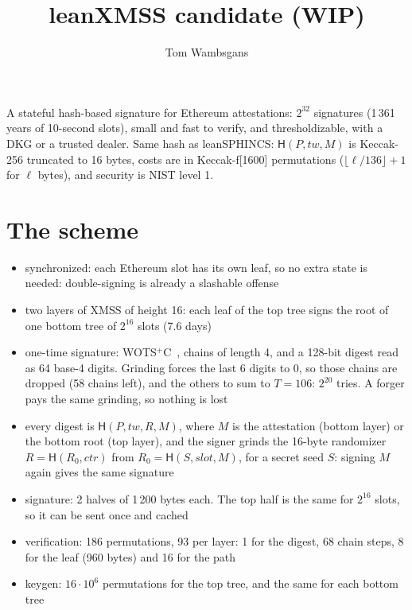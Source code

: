 \documentclass[11pt]{article}
\title{leanXMSS candidate (WIP)}
\author{Tom Wambsgans}
\date{}
\newcommand{\hash}{\mathsf{H}}
\begin{document}
\maketitle
\vspace{-3em}

\begin{center}
\end{center}

A stateful hash-based signature for Ethereum attestations: $2^{32}$ signatures (1\,361 years of 10-second
slots), small and fast to verify, and thresholdizable, with a DKG or a trusted dealer. Same hash as leanSPHINCS: $\hash(P,\mathit{tw},M)$ is Keccak-256 truncated to
16 bytes, costs are in Keccak-f[1600] permutations ($\lfloor\ell/136\rfloor+1$ for $\ell$ bytes), and security is NIST level 1.

\section{The scheme}

\begin{itemize}
  \item synchronized: each Ethereum slot has its own leaf, so no extra state is needed: double-signing is
        already a slashable offense
  \item two layers of XMSS of height 16: each leaf of the top tree signs the root of one bottom tree of
        $2^{16}$ slots (7.6 days)
  \item one-time signature: WOTS$^+$C~\cite{HK22C}, chains of length 4, and a 128-bit digest read as 64
        base-4 digits. Grinding forces the last 6 digits to 0, so those chains are dropped (58 chains
        left), and the others to sum to $T=106$: $2^{20}$ tries. A forger pays the same grinding, so nothing is lost
  \item every digest is $\hash(P,\mathit{tw},R,M)$, where $M$ is the attestation (bottom layer) or the bottom
        root (top layer), and the signer grinds the 16-byte randomizer $R=\hash(R_0,\mathit{ctr})$ from
        $R_0=\hash(S,\mathit{slot},M)$, for a secret seed $S$: signing $M$ again gives the same signature
\end{itemize}

\begin{itemize}
  \item signature: 2 halves of 1\,200 bytes each. The top half is the same for $2^{16}$ slots, so it can
        be sent once and cached
  \item verification: 186 permutations, 93 per layer: 1 for the digest, 68 chain steps, 8 for the leaf
        (960 bytes) and 16 for the path
  \item keygen: $16\cdot10^6$ permutations for the top tree, and the same for each bottom tree
\end{itemize}
\end{document}
